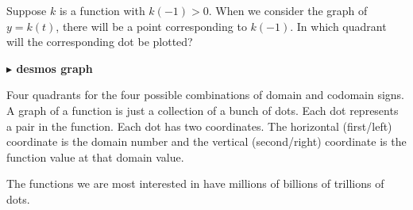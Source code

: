 \documentclass{ximera}
\begin{document}
\begin{question}
Suppose $k$ is a function with $k(-1)>0$. When we consider the graph of $y=k(t)$, there will be a point corresponding to $k(-1)$. In which quadrant will the corresponding dot be plotted?
\begin{image}
\end{image}


\textbf{\textcolor{blue!55!black}{$\blacktriangleright$ desmos graph}} 
\begin{center}
\end{center}



\begin{multipleChoice}
\end{multipleChoice}

\end{question}
Four quadrants for the four possible combinations of domain and codomain signs. \\


A graph of a function is just a collection of a bunch of dots.  Each dot represents a pair in the function.  Each dot has two coordinates.  The horizontal (first/left) coordinate is the domain number and the vertical (second/right) coordinate is the function value at that domain value.

The functions we are most interested in have millions of billions of trillions of dots.  
\end{document}
